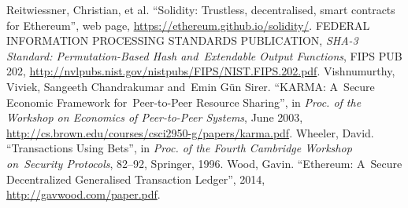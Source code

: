 \documentclass[a4paper]{article}
\begin{document}
\begin{thebibliography}{9}
   Reitwiessner, Christian, et al. ``Solidity: Trustless, decentralised, smart contracts for Ethereum'',
    web page, \url{https://ethereum.github.io/solidity/}.
 FEDERAL INFORMATION PROCESSING STANDARDS PUBLICATION,
  \textit{SHA-3 Standard: Permutation-Based Hash and~Extendable Output Functions}, FIPS PUB 202,
  \url{http://nvlpubs.nist.gov/nistpubs/FIPS/NIST.FIPS.202.pdf}.
 Vishnumurthy, Viviek, Sangeeth Chandrakumar and~Emin G\"{u}n Sirer.
  ``KARMA: A~Secure Economic Framework for~Peer-to-Peer Resource Sharing'', in
  \textit{Proc. of the Workshop on Economics of Peer-to-Peer Systems}, June 2003,
  \url{http://cs.brown.edu/courses/csci2950-g/papers/karma.pdf}.
 Wheeler, David. ``Transactions Using Bets'', in
  \textit{Proc. of the Fourth Cambridge Workshop on~Security Protocols}, 82--92, Springer, 1996.
 Wood, Gavin. ``Ethereum: A~Secure Decentralized Generalised Transaction Ledger'', 2014,
  \url{http://gavwood.com/paper.pdf}.
\end{thebibliography}
\appendix
\end{document}
